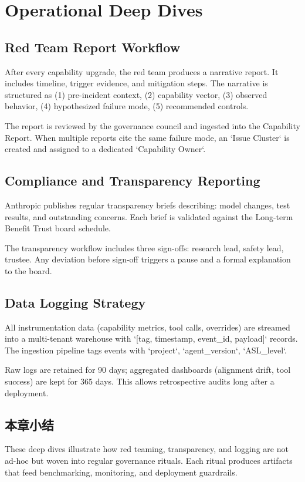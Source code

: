 \section{Operational Deep Dives}

\subsection{Red Team Report Workflow}

After every capability upgrade, the red team produces a narrative report. It includes timeline, trigger evidence, and mitigation steps. The narrative is structured as (1) pre-incident context, (2) capability vector, (3) observed behavior, (4) hypothesized failure mode, (5) recommended controls.

The report is reviewed by the governance council and ingested into the Capability Report. When multiple reports cite the same failure mode, an `Issue Cluster` is created and assigned to a dedicated `Capability Owner`.

\subsection{Compliance and Transparency Reporting}

Anthropic publishes regular transparency briefs describing: model changes, test results, and outstanding concerns. Each brief is validated against the Long-term Benefit Trust board schedule.

The transparency workflow includes three sign-offs: research lead, safety lead, trustee. Any deviation before sign-off triggers a pause and a formal explanation to the board.

\subsection{Data Logging Strategy}

All instrumentation data (capability metrics, tool calls, overrides) are streamed into a multi-tenant warehouse with `[tag, timestamp, event\_id, payload]` records. The ingestion pipeline tags events with `project`, `agent\_version`, `ASL\_level`.

Raw logs are retained for 90 days; aggregated dashboards (alignment drift, tool success) are kept for 365 days. This allows retrospective audits long after a deployment.

\subsection{本章小结}

These deep dives illustrate how red teaming, transparency, and logging are not ad-hoc but woven into regular governance rituals. Each ritual produces artifacts that feed benchmarking, monitoring, and deployment guardrails.
